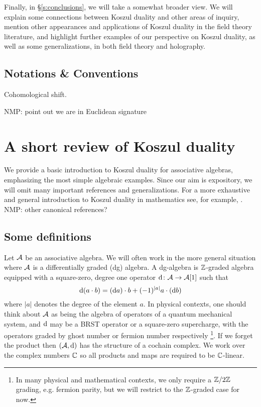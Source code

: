 \documentclass[11pt]{amsart}
\def\natalie#1{{\textcolor{green!65!black}{NMP: {#1}}}}
\begin{document}
Finally, in \S \ref{s:conclusions}, we will take a somewhat broader view. We will explain some connections between Koszul duality and other areas of inquiry, mention other appearances and applications of Koszul duality in the field theory literature, and highlight further examples of our perspective on Koszul duality, as well as some generalizations, in both field theory and holography. 

\subsection*{Notations \& Conventions}

Cohomological shift. 

\natalie{point out we are in Euclidean signature}



\section{A short review of Koszul duality} \label{s:review}


We provide a basic introduction to Koszul duality for associative algebras, emphasizing the most simple algebraic examples. Since our aim is expository, we will omit many important references and generalizations. For a more exhaustive and general introduction to Koszul duality in mathematics see, for example, \cite{LV}.  
\natalie{other canonical references?}

\subsection{Some definitions}

Let $\mathcal A$ be an associative algebra.
We will often work in the more general situation where $\mathcal A$ is a differentially graded (dg) algebra. 
A dg-algebra is $\mathbb Z$-graded algebra equipped with a square-zero, degree one operator ${\rm d} \colon \mathcal A \to \mathcal A[1]$ such that 
\[
{\rm d} (a \cdot b) = ({\rm d} a) \cdot b + (-1)^{|a|} a \cdot ({\rm d} b) 
\]
where $|a|$ denotes the degree of the element $a$. 
In physical contexts, one should think about $\mathcal A$ as being the algebra of operators of a quantum mechanical system, and ${\rm d}$ may be a BRST operator or a square-zero supercharge, with the operators graded by ghost number or fermion number respectively \footnote{In many physical and mathematical contexts, we only require a $\mathbb Z/2\mathbb Z$ grading, e.g. fermion parity, but we will restrict to the $\mathbb Z$-graded case for now.}.
If we forget the product then $(\mathcal A, {\rm d})$ has the structure of a cochain complex. 
We work over the complex numbers $\mathbb C$ so all products and maps are required to be $\mathbb C$-linear. 
\end{document}
